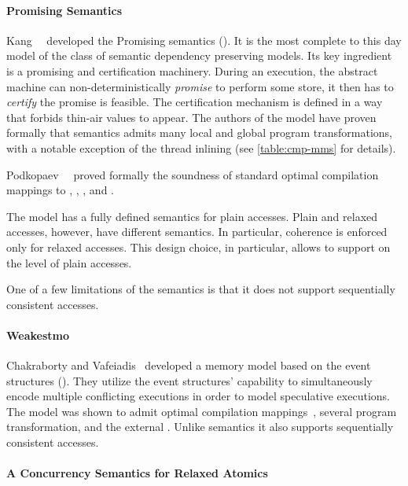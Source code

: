 \paragraph{Promising Semantics}

Kang~\etal~\cite{Kang-al:POPL17, Lee-al:PLDI20} developed 
the Promising semantics (\PRM).
It is the most complete to this day model of the class of
semantic dependency preserving models. 
Its key ingredient is a promising and certification machinery.
During an execution, the abstract machine can 
non-deterministically \emph{promise} to perform some store,
it then has to \emph{certify} the promise is feasible. 
The certification mechanism is defined in a way that forbids thin-air values to appear.
The authors of the model have proven formally 
that \Promising semantics admits many local and global program transformations,
with a notable exception of the thread inlining
(see \cref{table:cmp-mms} for details).

Podkopaev~\etal~\cite{Podkopaev-al:ECOOP17, Podkopaev-al:POPL19} 
proved formally the soundness of standard optimal 
compilation mappings to \Intel, , , and \POWER.

The model has a fully defined semantics for plain accesses.  
Plain and relaxed accesses, however, have different semantics.
In particular, coherence is enforced only for relaxed accesses. 
This design choice, in particular, allows to support 
\CSE on the level of plain accesses. 

One of a few limitations of the \Promising semantics is that 
it does not support sequentially consistent accesses. 

\paragraph{Weakestmo}

Chakraborty and Vafeiadis~\cite{Chakraborty-Vafeiadis:CGO17, Chakraborty-Vafeiadis:POPL19}
developed a memory model based on the event structures (\WMO). 
They utilize the event structures' capability to simultaneously encode 
multiple conflicting executions in order to model speculative executions.
The model was shown to admit optimal compilation mappings~\cite{Moiseenko-al:ECOOP20},
several program transformation, and the external \DRF.
Unlike \Promising semantics it also supports 
sequentially consistent accesses.

\paragraph{A Concurrency Semantics for Relaxed Atomics}

